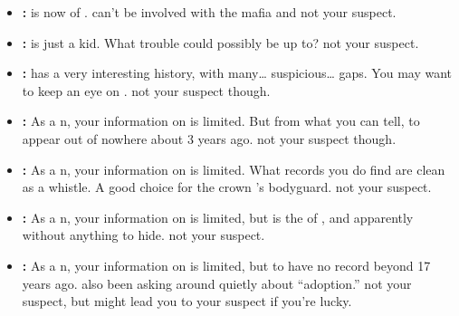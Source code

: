 \documentclass[green]{NeptuneBall}
\begin{document}
\begin{itemize}
	\item \textbf{\cAriel{\full}:} \cAriel{} is now \cAriel{\King} of \pAmerica{}. \cAriel{\They} can't be involved with the mafia and \cAriel{\are} not your suspect.
	
	\item \textbf{\cWillow{\full}:} \cWillow{} is just a kid. What trouble could \cWillow{\they} possibly be up to? \cWillow{\they} \cWillow{\are} not your suspect.
	
	\item \textbf{\cManta{\full}:} \cManta{} has a very interesting history, with many\ldots{} suspicious\ldots{} gaps. You may want to keep an eye on \cManta{\them}. \cManta{\They} \cManta{\are} not your suspect though.
	
	\item \textbf{\cDiplomat{\full}:} As a \pPacifica{}n, your information on \cDiplomat{} is limited. But from what you can tell, \cDiplomat{\they}  to appear out of nowhere about 3 years ago. \cDiplomat{\They} \cDiplomat{\are} not your suspect though.
	
	\item \textbf{\cBodyguard{\full}:} As a \pPacifica{}n, your information on \cBodyguard{} is limited. What records you do find are clean as a whistle. A good choice for the crown \cPrince{\prince}'s bodyguard. \cBodyguard{\They} \cBodyguard{\are} not your suspect.
	
	\item \textbf{\cPrince{\full}:} As a \pPacifica{}n, your information on \cPrince{} is limited, but \cPrince{} is the \cPrince{\Prince} of \pPacifica{}, and apparently without anything to hide. \cPrince{\They} \cPrince{\are} not your suspect.
	
	\item \textbf{\cSpy{\full}:} As a \pPacifica{}n, your information on \cSpy{} is limited, but \cSpy{\they}  to have no record beyond 17 years ago. \cSpy{\They} \cSpy{\have} also been asking around quietly about ``adoption.'' \cSpy{\They} \cSpy{\are} not your suspect, but might lead you to your suspect if you're lucky.
\end{itemize}
\end{document}
